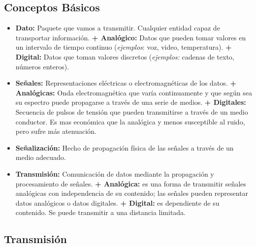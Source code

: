 \documentclass[10pt,a4paper]{article}
\begin{document}
\subsection{Conceptos Básicos}
\begin{itemize}
\item \textbf{Dato:} Paquete que vamos a transmitir. Cualquier entidad capaz de transportar información.
\subitem \textbf{+ Analógico:} Datos que pueden tomar valores en un intervalo de tiempo continuo (\textit{ejemplos}: voz, video, temperatura).
\subitem \textbf{+ Digital:} Datos que toman valores discretos (\textit{ejemplos:} cadenas de texto, números enteros).
\item \textbf{Señales:} Representaciones eléctricas o electromagnéticas de los datos.
\subitem \textbf{+ Analógicas:} Onda electromagnética que varía continuamente y que según sea su espectro puede propagarse a través de una serie de medios.
\subitem \textbf{+ Digitales:} Secuencia de pulsos de tensión que pueden transmitirse a través de un medio conductor. Es mas económica que la analógica y menos susceptible al ruido, pero sufre más atenuación.
\item \textbf{Señalización:} Hecho de propagación física de las señales a través de un medio adecuado.
\item \textbf{Transmisión:} Comunicación de datos mediante la propagación y procesamiento de señales.
\subitem \textbf{+ Analógica:} es una forma de transmitir señales analógicas con independencia de su contenido; las señales pueden representar
datos analógicos o datos digitales.
\subitem \textbf{+ Digital:} es dependiente de su contenido. Se puede transmitir a una distancia limitada.
\end{itemize}

\subsection{Transmisión}
\end{document}
